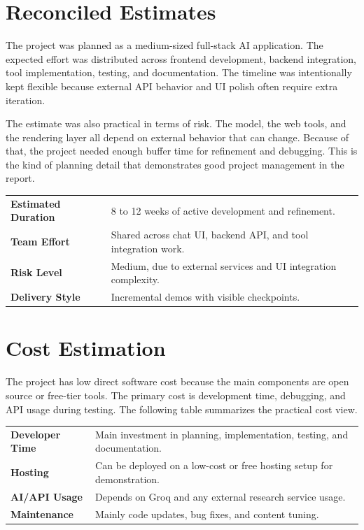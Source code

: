 \documentclass[11pt,oneside]{report}
\begin{document}
\section{Reconciled Estimates}
The project was planned as a medium-sized full-stack AI application. The expected effort was distributed across frontend development, backend integration, tool implementation, testing, and documentation. The timeline was intentionally kept flexible because external API behavior and UI polish often require extra iteration.

The estimate was also practical in terms of risk. The model, the web tools, and the rendering layer all depend on external behavior that can change. Because of that, the project needed enough buffer time for refinement and debugging. This is the kind of planning detail that demonstrates good project management in the report.

\begin{tabularx}{\textwidth}{>{\bfseries}p{}X}
Estimated Duration & 8 to 12 weeks of active development and refinement. \\
Team Effort & Shared across chat UI, backend API, and tool integration work. \\
Risk Level & Medium, due to external services and UI integration complexity. \\
Delivery Style & Incremental demos with visible checkpoints. \\
\end{tabularx}

\section{Cost Estimation}
The project has low direct software cost because the main components are open source or free-tier tools. The primary cost is development time, debugging, and API usage during testing. The following table summarizes the practical cost view.

\begin{tabularx}{\textwidth}{>{\bfseries}p{}X}
Developer Time & Main investment in planning, implementation, testing, and documentation. \\
Hosting & Can be deployed on a low-cost or free hosting setup for demonstration. \\
AI/API Usage & Depends on Groq and any external research service usage. \\
Maintenance & Mainly code updates, bug fixes, and content tuning. \\
\end{tabularx}
\end{document}
